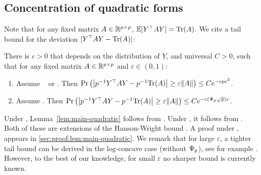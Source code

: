 \documentclass[times,sort&compress,3p]{elsarticle}
\begin{document}
\subsection{Concentration of quadratic forms}

Note that for any fixed matrix $A\in \mathbb{R}^{p\times p}$, ${\mathbb{E}} [Y^\top A Y] = \textrm{Tr}(A)$. We cite a tail bound for the deviation $|Y^\top A Y - \textrm{Tr}(A)|$:  

\begin{lemma}
    \label{lem:main-quadratic}
    There is $c>0$ that depends on the distribution of $Y$, and universal $C>0$, such that for any fixed matrix $A\in \mathbb{R}^{p\times p}$ and $\varepsilon\in (0,1)$:
    \begin{enumerate}
        \item Assume \AssumIndep~ or \AssumCCPSB. Then $\Pr\left( \left| p^{-1}Y^\top A Y - p^{-1}\textrm{Tr}(A)\right| \ge \varepsilon\|A\| \right) \le C e^{-cp\varepsilon^2}$.
        \item Assume \AssumLC. Then $\Pr\left( \left| p^{-1}Y^\top A Y - p^{-1}\textrm{Tr}(A)\right| \ge \varepsilon\|A\| \right) \le C e^{-c(\Psi_p\sqrt{p})\varepsilon}$.
    \end{enumerate}
\end{lemma}
Under \AssumIndep, Lemma~\ref{lem:main-quadratic} follows from \cite{rudelson2013hanson}. Under \AssumCCPSB, it follows from \cite{adamczak2015note}. Both of these are extensions of the Hanson-Wright bound \cite{hanson1971bound}. A proof under \AssumLC,  appears in \ref{sec:proof:lem:main-quadratic}.
We remark that for large $\varepsilon$, a tighter tail bound can be derived in the log-concave case (without $\Psi_p$), see for example \cite{lee2017eldan}. 
However, to the best of our knowledge, for small 
$\varepsilon$ no sharper bound is currently known. 


\end{document}
